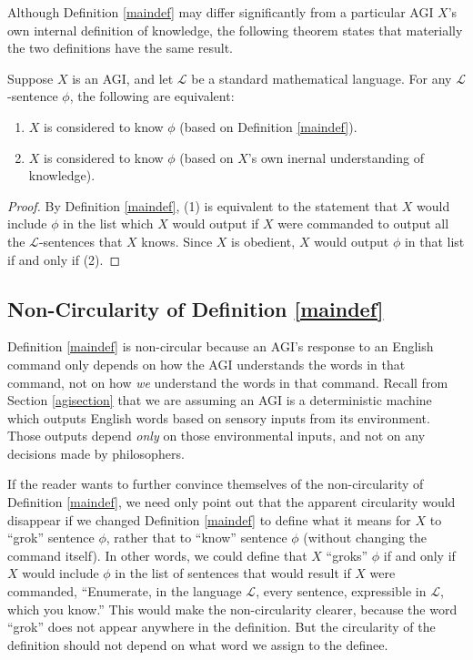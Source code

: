 \documentclass[runningheads]{llncs}
\begin{document}
Although Definition \ref{maindef} may differ significantly from a particular AGI
$X$'s own internal definition of knowledge, the following theorem states that
materially the two definitions have the same result.

\begin{theorem}
\label{sentenceequivalence}
  Suppose $X$ is an AGI, and let $\mathscr L$
  be a standard mathematical language. For any $\mathscr L$-sentence $\phi$, the following
  are equivalent:
  \begin{enumerate}
    \item $X$ is
    considered to know $\phi$ (based on Definition \ref{maindef}).
    \item
    $X$ is considered to know $\phi$ (based on $X$'s own inernal understanding of
    knowledge).
  \end{enumerate}
\end{theorem}

\begin{proof}
  By Definition \ref{maindef}, (1) is equivalent to the statement that $X$ would
  include $\phi$ in the list which $X$ would output if $X$ were commanded to output
  all the $\mathscr L$-sentences that $X$ knows. Since $X$ is obedient, $X$ would output
  $\phi$ in that list if and only if (2).
\end{proof}

\subsection{Non-Circularity of Definition \ref{maindef}}
\label{noncircularsubsection}

Definition \ref{maindef} is non-circular because an AGI's response to an English
command only depends on how the AGI understands the words in that command, not
on how \emph{we} understand the words in that command. Recall from Section \ref{agisection}
that we are assuming an AGI is a deterministic machine which outputs English words
based on sensory inputs from its environment. Those outputs depend \emph{only} on those
environmental inputs, and not on any decisions made by philosophers.

If the reader wants to further convince themselves of the non-circularity of Definition
\ref{maindef}, we need only point out that the apparent circularity would disappear if
we changed Definition \ref{maindef} to define what it means for $X$ to ``grok'' sentence
$\phi$, rather that to ``know'' sentence $\phi$ (without changing the command itself).
In other words, we could define that $X$ ``groks'' $\phi$ if and only if $X$ would include
$\phi$ in the list of sentences that would result if $X$ were commanded,
``Enumerate, in the language $\mathscr L$, every sentence,
  expressible in $\mathscr L$, which you know.''
This would make the non-circularity clearer, because the word ``grok'' does not appear
anywhere in the definition. But the circularity of the definition should not depend on
what word we assign to the definee.
\end{document}
